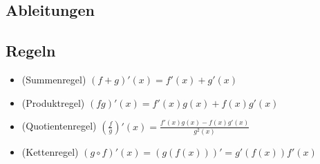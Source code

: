 \subsection{Ableitungen}
\subsection{Regeln}
\begin{itemize}[leftmargin=*]
	\item (Summenregel) $(f + g)'(x) = f'(x) + g'(x)$
	\item (Produktregel) $(fg)'(x) = f'(x)g(x) + f(x)g'(x)$
	\item (Quotientenregel) $(\frac{f}{g})'(x) = \frac{f'(x)g(x) -
	f(x)g'(x)}{g^2(x)}$
	\item (Kettenregel) $(g \circ f)'(x) = (g(f(x)))' = g'(f(x)) f'(x)$
\end{itemize}

